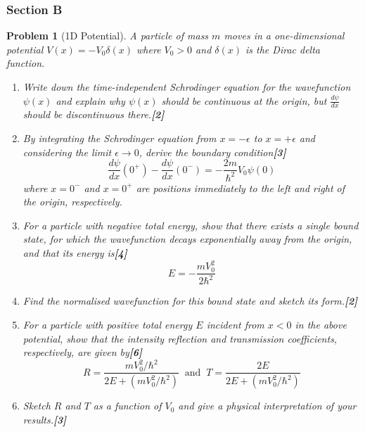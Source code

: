 \documentclass[a4paper]{article}
\theoremstyle{new}
\newtheorem{qns}{Problem}[subsection]
\begin{document}
\subsubsection{Section B}
\begin{qns}[1D Potential]
A particle of mass $m$ moves in a one-dimensional potential $V(x)=-V_0\delta(x)$ where $V_0 > 0$ and $\delta(x)$ is the Dirac delta function.
\begin{enumerate}[label=(\roman*)]
\item Write down the time-independent Schrodinger equation for the wavefunction $\psi(x)$ and explain why $\psi(x)$ should be continuous at the origin, but $\frac{d\psi}{dx}$ should be discontinuous there.\hfill\textbf{[2]}
\item By integrating the Schrodinger equation from $x=-\epsilon$ to $x = +\epsilon$ and considering the limit $\epsilon\rightarrow0$, derive the boundary condition\hfill\textbf{[3]}
$$\frac{d\psi}{dx}(0^+)-\frac{d\psi}{dx}(0^-)=-\frac{2m}{\hbar^2}V_0\psi(0)$$
where $x=0^-$ and $x = 0^+$ are positions immediately to the left and right of the origin, respectively.
\item For a particle with negative total energy, show that there exists a single bound state, for which the wavefunction decays exponentially away from the origin, and that its energy is\hfill\textbf{[4]}
$$E=-\frac{mV_0^2}{2\hbar^2}$$
\item Find the normalised wavefunction for this bound state and sketch its form.\hfill\textbf{[2]}
\item For a particle with positive total energy $E$ incident from $x < 0$ in the above potential, show that the intensity reflection and transmission coefficients, respectively, are given by\hfill\textbf{[6]}
$$R=\frac{mV_0^2/\hbar^2}{2E+(mV_0^2/\hbar^2)}~\text{ and }~ T=\frac{2E}{2E+(mV_0^2/\hbar^2)}$$
\item Sketch $R$ and $T$ as a function of $V_0$ and give a physical interpretation of your results.\hfill\textbf{[3]}
\end{enumerate}
\end{qns}
\end{document}
